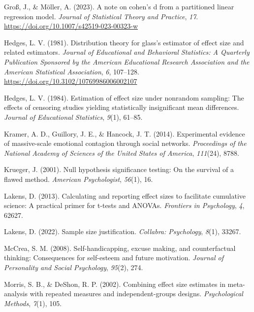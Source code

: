 \documentclass[
  man]{apa7}
\newlength{\cslhangindent}
\newlength{\cslentryspacingunit} %
\newenvironment{CSLReferences}[2] %
 {%
  \setlength{\parindent}{0pt}
  \ifodd #1
  \let\oldpar\par
  \def\par{\hangindent=\cslhangindent\oldpar}
  \fi
  \setlength{\parskip}{#2\cslentryspacingunit}
 }%
 {}
\begin{document}
\begin{CSLReferences}{1}{0}
\leavevmode{}%
Groß, J., \& Möller, A. (2023). A note on cohen's d from a partitioned linear regression model. \emph{Journal of Statistical Theory and Practice}, \emph{17}. \url{https://doi.org/10.1007/s42519-023-00323-w}

\leavevmode{}%
Hedges, L. V. (1981). Distribution theory for glass's estimator of effect size and related estimators. \emph{Journal of Educational and Behavioral Statistics: A Quarterly Publication Sponsored by the American Educational Research Association and the American Statistical Association}, \emph{6}, 107--128. \url{https://doi.org/10.3102/10769986006002107}

\leavevmode{}%
Hedges, L. V. (1984). Estimation of effect size under nonrandom sampling: The effects of censoring studies yielding statistically insignificant mean differences. \emph{Journal of Educational Statistics}, \emph{9}(1), 61--85.

\leavevmode{}%
Kramer, A. D., Guillory, J. E., \& Hancock, J. T. (2014). Experimental evidence of massive-scale emotional contagion through social networks. \emph{Proceedings of the National Academy of Sciences of the United States of America}, \emph{111}(24), 8788.

\leavevmode{}%
Krueger, J. (2001). Null hypothesis significance testing: On the survival of a flawed method. \emph{American Psychologist}, \emph{56}(1), 16.

\leavevmode{}%
Lakens, D. (2013). Calculating and reporting effect sizes to facilitate cumulative science: A practical primer for t-tests and ANOVAs. \emph{Frontiers in Psychology}, \emph{4}, 62627.

\leavevmode{}%
Lakens, D. (2022). Sample size justification. \emph{Collabra: Psychology}, \emph{8}(1), 33267.

\leavevmode{}%
McCrea, S. M. (2008). Self-handicapping, excuse making, and counterfactual thinking: Consequences for self-esteem and future motivation. \emph{Journal of Personality and Social Psychology}, \emph{95}(2), 274.

\leavevmode{}%
Morris, S. B., \& DeShon, R. P. (2002). Combining effect size estimates in meta-analysis with repeated measures and independent-groups designs. \emph{Psychological Methods}, \emph{7}(1), 105.


\end{CSLReferences}
\end{document}
